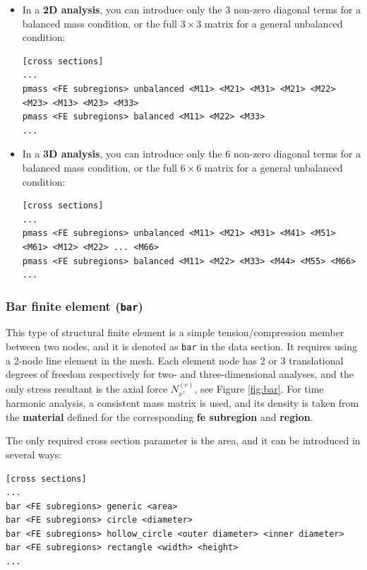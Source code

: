 \documentclass[a4paper,fleqn]{book}
\begin{document}
\begin{itemize}
 \item In a \textbf{2D analysis}, you can introduce only the $3$ non-zero diagonal terms for a balanced mass condition, or the full $3\times3$ matrix for a general unbalanced condition:
\begin{Verbatim}[frame=single, fontsize=\small, label={format of section [cross sections] for pmass elements}]
[cross sections]
...
pmass <FE subregions> unbalanced <M11> <M21> <M31> <M21> <M22> <M23> <M13> <M23> <M33>
pmass <FE subregions> balanced <M11> <M22> <M33>
...
\end{Verbatim}

 \item In a \textbf{3D analysis}, you can introduce only the $6$ non-zero diagonal terms for a balanced mass condition, or the full $6\times6$ matrix for a general unbalanced condition:
\begin{Verbatim}[frame=single, fontsize=\small, label={format of section [cross sections] for pmass elements}]
[cross sections]
...
pmass <FE subregions> unbalanced <M11> <M21> <M31> <M41> <M51> <M61> <M12> <M22> ... <M66>
pmass <FE subregions> balanced <M11> <M22> <M33> <M44> <M55> <M66>
...
\end{Verbatim}

\end{itemize}

\subsubsection{Bar finite element (\texttt{bar})}

This type of structural finite element is a simple tension/compression member \cite{onate2013} between two nodes, and it is denoted as \texttt{bar} in the data section. It requires using a 2-node line element in the mesh. Each element node has 2 or 3 translational degrees of freedom respectively for two- and three-dimensional analyses, and the only stress resultant is the axial force $N_{x'}^{(e)}$, see Figure \ref{fig:bar}. For time harmonic analysis,  a consistent mass matrix is used, and its density is taken from the \textbf{material} defined for the corresponding \textbf{fe subregion} and \textbf{region}.

The only required cross section parameter is the area, and it can be introduced in several ways:
\begin{Verbatim}[frame=single, fontsize=\small, label={format of section [cross sections] for bar elements}]
[cross sections]
...
bar <FE subregions> generic <area>
bar <FE subregions> circle <diameter>
bar <FE subregions> hollow_circle <outer diameter> <inner diameter>
bar <FE subregions> rectangle <width> <height>
...
\end{Verbatim}
\end{document}
